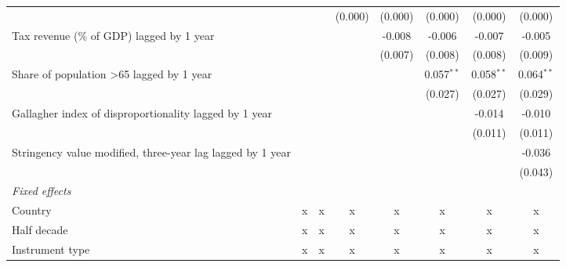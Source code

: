 \begin{tabular}{lccccccc}
                                                                                         &         &         & (0.000) & (0.000)     & (0.000)       & (0.000)      & (0.000)\\   
   Tax revenue (\% of GDP) lagged by 1 year                                              &         &         &         & -0.008      & -0.006        & -0.007       & -0.005\\   
                                                                                         &         &         &         & (0.007)     & (0.008)       & (0.008)      & (0.009)\\   
   Share of population >65 lagged by 1 year                                              &         &         &         &             & 0.057$^{**}$  & 0.058$^{**}$ & 0.064$^{**}$\\   
                                                                                         &         &         &         &             & (0.027)       & (0.027)      & (0.029)\\   
   Gallagher index of disproportionality lagged by 1 year                                &         &         &         &             &               & -0.014       & -0.010\\   
                                                                                         &         &         &         &             &               & (0.011)      & (0.011)\\   
   Stringency value modified, three-year lag lagged by 1 year                            &         &         &         &             &               &              & -0.036\\   
                                                                                         &         &         &         &             &               &              & (0.043)\\   
   \emph{Fixed effects}\\
   Country                                                                               & x       & x       & x       & x           & x             & x            & x\\  
   Half decade                                                                           & x       & x       & x       & x           & x             & x            & x\\  
   Instrument type                                                                       & x       & x       & x       & x           & x             & x            & x\\  

\end{tabular}
